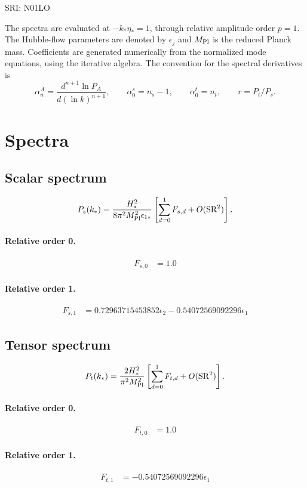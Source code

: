 \documentclass[10pt]{article}
\begin{document}
\begin{center}\Large SRI: N01LO\end{center}
The spectra are evaluated at $-k_*\eta_*=1$, through relative amplitude
order $p=1$. The Hubble-flow parameters are denoted by $\epsilon_j$
and $M_{\rm Pl}$ is the reduced Planck mass. Coefficients are generated
numerically from the normalized mode equations, using the iterative algebra.
The convention for the spectral derivatives is
\[
\alpha_n^A=\frac{d^{n+1}\ln P_A}{d(\ln k)^{n+1}},\qquad
\alpha_0^s=n_s-1,\qquad\alpha_0^t=n_t,\qquad r=P_t/P_s.
\]
\section{Spectra}

\subsection{Scalar spectrum}
\[P_s(k_*)=\frac{H_*^2}{8\pi^2M_{\rm Pl}^2\epsilon_{1*}}\left[\sum_{d=0}^{1}F_{s,d}+O(\mathrm{SR}^{2})\right].\]
\paragraph{Relative order 0.}
\begin{align*}
F_{s,0} &= 1.0
\end{align*}

\paragraph{Relative order 1.}
\begin{align*}
F_{s,1} &= 0.72963715453852 \epsilon_{2} - 0.54072569092296 \epsilon_{1}
\end{align*}

\subsection{Tensor spectrum}
\[P_t(k_*)=\frac{2H_*^2}{\pi^2M_{\rm Pl}^2}\left[\sum_{d=0}^{1}F_{t,d}+O(\mathrm{SR}^{2})\right].\]
\paragraph{Relative order 0.}
\begin{align*}
F_{t,0} &= 1.0
\end{align*}

\paragraph{Relative order 1.}
\begin{align*}
F_{t,1} &=  - 0.54072569092296 \epsilon_{1}
\end{align*}
\end{document}

